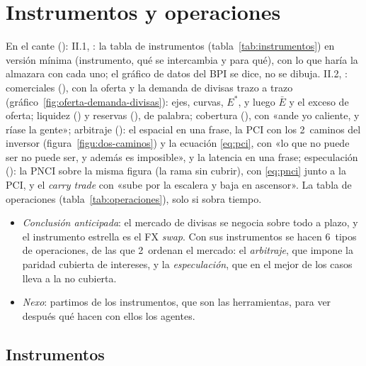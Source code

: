 \documentclass[11pt]{article}
\begin{document}
\section{Instrumentos y operaciones}\label{sec:instrumentos-operaciones}

\begin{notaopositor}
En el cante (): II.1, : la tabla de instrumentos (tabla~\ref{tab:instrumentos}) en versión mínima (instrumento, qué se intercambia y para qué), con lo que haría la almazara con cada uno; el gráfico de datos del BPI se dice, no se dibuja. II.2, : comerciales (), con la oferta y la demanda de divisas trazo a trazo (gráfico~\ref{fig:oferta-demanda-divisas}): ejes, curvas, $E^{*}$, y luego $\bar E$ y el exceso de oferta; liquidez () y reservas (), de palabra; cobertura (), con «ande yo caliente, y ríase la gente»; arbitraje (): el espacial en una frase, la PCI con los 2~caminos del inversor (figura~\ref{figu:dos-caminos}) y la ecuación \eqref{eq:pci}, con «lo que no puede ser no puede ser, y además es imposible», y la latencia en una frase; especulación (): la PNCI sobre la misma figura (la rama sin cubrir), con \eqref{eq:pnci} junto a la PCI, y el \emph{carry trade} con «sube por la escalera y baja en ascensor». La tabla de operaciones (tabla~\ref{tab:operaciones}), solo si sobra tiempo.
\end{notaopositor}

\begin{itemize}
\item \emph{Conclusión anticipada}: el mercado de divisas se negocia sobre todo a plazo, y el instrumento estrella es el FX \emph{swap}. Con sus instrumentos se hacen 6~tipos de operaciones, de las que 2~ordenan el mercado: el \emph{arbitraje}, que impone la paridad cubierta de intereses, y la \emph{especulación}, que en el mejor de los casos lleva a la no cubierta.
\item \emph{Nexo}: partimos de los instrumentos, que son las herramientas, para ver después qué hacen con ellos los agentes.
\end{itemize}

\subsection{Instrumentos}\label{sec:instrumentos}
\end{document}

